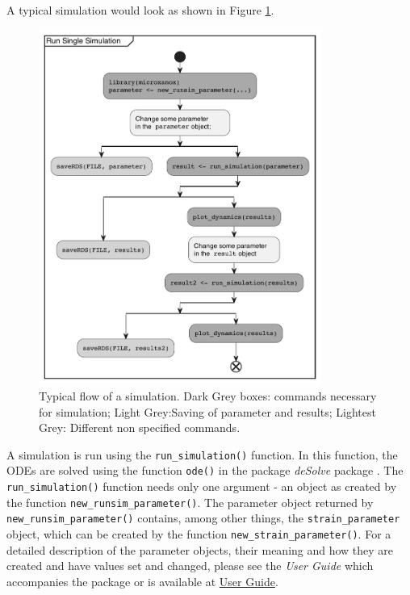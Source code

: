 \documentclass[]{elsarticle} %
\begin{document}
A typical simulation would look as shown in Figure \ref{fig:runsimexample}.

\begin{figure}

{\centering \includegraphics[width=350px]{./figures/simflow} 

}

\caption{Typical flow of a simulation. Dark Grey boxes: commands necessary for simulation; Light Grey:Saving of parameter and results; Lightest Grey: Different non specified commands.}\label{fig:runsimexample}
\end{figure}

A simulation is run using the \texttt{run\_simulation()} function. In this function, the ODEs are solved using the function \texttt{ode()} in the package \emph{deSolve} package \citep{Soetaert2010}. The \texttt{run\_simulation()} function needs only one argument - an object as created by the function \texttt{new\_runsim\_parameter()}. The parameter object returned by \texttt{new\_runsim\_parameter()} contains, among other things, the \texttt{strain\_parameter} object, which can be created by the function \texttt{new\_strain\_parameter()}. For a detailed description of the parameter objects, their meaning and how they are created and have values set and changed, please see the \emph{User Guide} which accompanies the package or is available at \href{https://uzh-peg.r-universe.dev/articles/microxanox/User-guide.html}{User Guide}.
\end{document}
